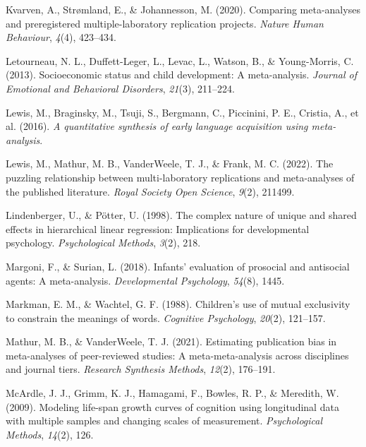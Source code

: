 \documentclass[
  man]{apa6}
\newlength{\cslhangindent}
\newlength{\cslentryspacingunit} %
\newenvironment{CSLReferences}[2] %
 {%
  \setlength{\parindent}{0pt}
  \ifodd #1
  \let\oldpar\par
  \def\par{\hangindent=\cslhangindent\oldpar}
  \fi
  \setlength{\parskip}{#2\cslentryspacingunit}
 }%
 {}
\begin{document}
\begin{CSLReferences}{1}{0}
\leavevmode{}%
Kvarven, A., Strømland, E., \& Johannesson, M. (2020). Comparing meta-analyses and preregistered multiple-laboratory replication projects. \emph{Nature Human Behaviour}, \emph{4}(4), 423--434.

\leavevmode{}%
Letourneau, N. L., Duffett-Leger, L., Levac, L., Watson, B., \& Young-Morris, C. (2013). Socioeconomic status and child development: A meta-analysis. \emph{Journal of Emotional and Behavioral Disorders}, \emph{21}(3), 211--224.

\leavevmode{}%
Lewis, M., Braginsky, M., Tsuji, S., Bergmann, C., Piccinini, P. E., Cristia, A., et al. (2016). \emph{A quantitative synthesis of early language acquisition using meta-analysis}.

\leavevmode{}%
Lewis, M., Mathur, M. B., VanderWeele, T. J., \& Frank, M. C. (2022). The puzzling relationship between multi-laboratory replications and meta-analyses of the published literature. \emph{Royal Society Open Science}, \emph{9}(2), 211499.

\leavevmode{}%
Lindenberger, U., \& Pötter, U. (1998). The complex nature of unique and shared effects in hierarchical linear regression: Implications for developmental psychology. \emph{Psychological Methods}, \emph{3}(2), 218.

\leavevmode{}%
Margoni, F., \& Surian, L. (2018). Infants' evaluation of prosocial and antisocial agents: A meta-analysis. \emph{Developmental Psychology}, \emph{54}(8), 1445.

\leavevmode{}%
Markman, E. M., \& Wachtel, G. F. (1988). Children's use of mutual exclusivity to constrain the meanings of words. \emph{Cognitive Psychology}, \emph{20}(2), 121--157.

\leavevmode{}%
Mathur, M. B., \& VanderWeele, T. J. (2021). Estimating publication bias in meta-analyses of peer-reviewed studies: A meta-meta-analysis across disciplines and journal tiers. \emph{Research Synthesis Methods}, \emph{12}(2), 176--191.

\leavevmode{}%
McArdle, J. J., Grimm, K. J., Hamagami, F., Bowles, R. P., \& Meredith, W. (2009). Modeling life-span growth curves of cognition using longitudinal data with multiple samples and changing scales of measurement. \emph{Psychological Methods}, \emph{14}(2), 126.


\end{CSLReferences}
\end{document}
